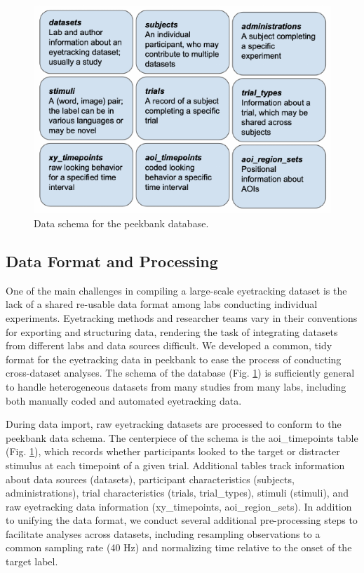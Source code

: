 \documentclass[10pt, letterpaper]{article}
\newenvironment{CodeChunk}{}{}
\begin{document}
\begin{CodeChunk}
\begin{figure}[tb]

{\centering \includegraphics{figs/fig_schema-1} 

}

\caption[Data schema for the peekbank database]{Data schema for the peekbank database.}\label{fig:fig_schema}
\end{figure}
\end{CodeChunk}

\hypertarget{data-format-and-processing}{%
\subsection{Data Format and
Processing}\label{data-format-and-processing}}

One of the main challenges in compiling a large-scale eyetracking
dataset is the lack of a shared re-usable data format among labs
conducting individual experiments. Eyetracking methods and researcher
teams vary in their conventions for exporting and structuring data,
rendering the task of integrating datasets from different labs and data
sources difficult. We developed a common, tidy format for the
eyetracking data in peekbank to ease the process of conducting
cross-dataset analyses. The schema of the database (Fig.
\ref{fig:fig_schema}) is sufficiently general to handle heterogeneous
datasets from many studies from many labs, including both manually coded
and automated eyetracking data.

During data import, raw eyetracking datasets are processed to conform to
the peekbank data schema. The centerpiece of the schema is the
aoi\_timepoints table (Fig. \ref{fig:fig_schema}), which records whether
participants looked to the target or distracter stimulus at each
timepoint of a given trial. Additional tables track information about
data sources (datasets), participant characteristics (subjects,
administrations), trial characteristics (trials, trial\_types), stimuli
(stimuli), and raw eyetracking data information (xy\_timepoints,
aoi\_region\_sets). In addition to unifying the data format, we conduct
several additional pre-processing steps to facilitate analyses across
datasets, including resampling observations to a common sampling rate
(40 Hz) and normalizing time relative to the onset of the target label.
\end{document}
